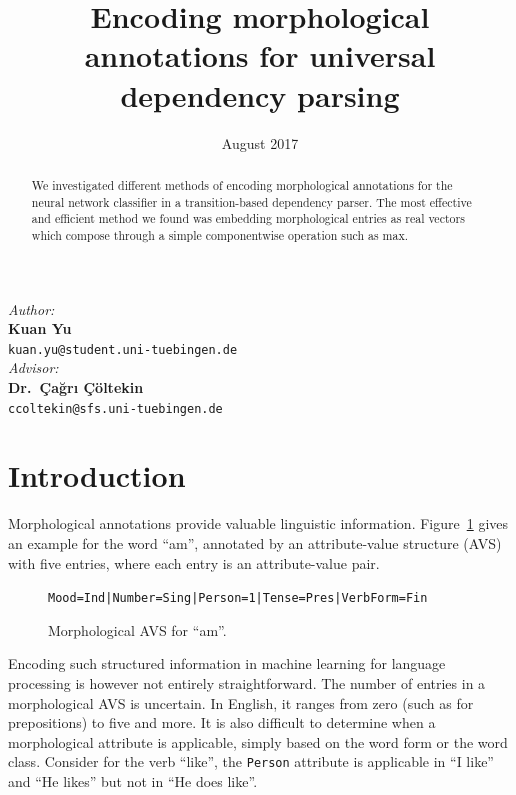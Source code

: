 \documentclass[11pt]{article}
\date{August 2017}
\title{Encoding morphological annotations for universal dependency parsing}
\begin{document}
\maketitle
\begin{center}
  \vfill
  \textit{Author:}\\\smallskip
  \textbf{Kuan Yu}\\\smallskip
  \texttt{kuan.yu@student.uni-tuebingen.de}\\\vfill
  \textit{Advisor:}\\\smallskip
  \textbf{Dr.~Çağrı Çöltekin}\\\smallskip
  \texttt{ccoltekin@sfs.uni-tuebingen.de}\\\vfill
\end{center}

\begin{abstract}
  We investigated different methods of encoding morphological annotations for the neural network classifier in a transition-based dependency parser.
  The most effective and efficient method we found was embedding morphological entries as real vectors
  which compose through a simple componentwise operation such as max.
\end{abstract}

\section{Introduction}
\label{sec:intro}

Morphological annotations provide valuable linguistic information.
Figure~\ref{fig:feats} gives an example for the word ``am'',
annotated by an attribute-value structure (AVS) with five entries,
where each entry is an attribute-value pair.

\begin{figure}[htb!]
  \centering
  \texttt{Mood=Ind|Number=Sing|Person=1|Tense=Pres|VerbForm=Fin}
  \caption[]{\label{fig:feats}Morphological AVS for ``am''.}
\end{figure}

Encoding such structured information in machine learning for language processing is however not entirely straightforward.
The number of entries in a morphological AVS is uncertain.
In English, it ranges from zero (such as for prepositions) to five and more.
It is also difficult to determine when a morphological attribute is applicable,
simply based on the word form or the word class.
Consider for the verb ``like'',
the \texttt{Person} attribute is applicable in ``I like'' and ``He likes'' but not in ``He does like''.
\end{document}
